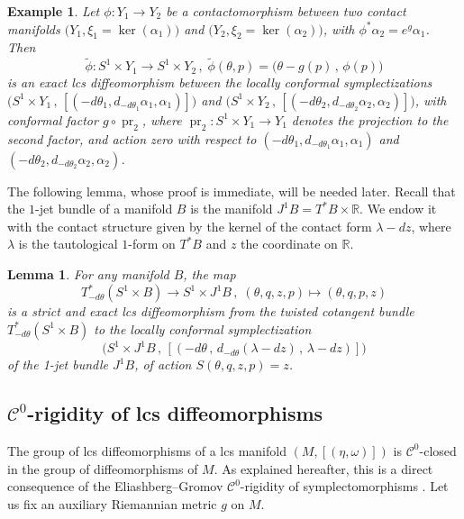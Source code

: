 \documentclass{amsart}
\DeclareMathOperator{\pr}{pr}
\newtheorem{lemma}[thm]{Lemma}
\newtheorem{example}[thm]{Example}
\theoremstyle{remark}
\begin{document}
\begin{example}\label{example: lift of maps to symplectization}
Let $\phi: Y_1 \rightarrow Y_2$ be a contactomorphism
between two contact manifolds $\big(Y_1, \xi_1 = \ker (\alpha_1)\big)$
and $\big(Y_2, \xi_2 = \ker (\alpha_2)\big)$,
with $\phi^{\ast}\alpha_2 = e^g\alpha_1$.
Then
\[
\widetilde{\phi}: S^1 \times Y_1 \rightarrow S^1 \times Y_2 \,,\;
\widetilde{\phi}(\theta, p) = \big( \theta - g(p) \,,\, \phi(p) \big)  
\]
is an exact lcs diffeomorphism
between the locally conformal symplectizations
$\big( S^1 \times Y_1 \,,\, [(-d\theta_1 , d_{-d\theta_1}\alpha_1 , \alpha_1)] \big)$
and $\big( S^1 \times Y_2 \,,\, [(-d\theta_2 , d_{-d\theta_2}\alpha_2 , \alpha_2)] \big)$,
with conformal factor $g \circ \pr_2$,
where $\pr_2: S^1 \times Y_1 \rightarrow Y_1$
denotes the projection to the second factor,
and action zero
with respect to $(-d\theta_1 , d_{-d\theta_1} \alpha_1 , \alpha_1)$
and $(-d\theta_2 , d_{-d\theta_2} \alpha_2 , \alpha_2)$.
\end{example}

The following lemma,
whose proof is immediate,
will be needed later.
Recall that the $1$-jet bundle of a manifold $B$
is the manifold $J^1B = T^{\ast}B \times \mathbb{R}$.
We endow it with the contact structure
given by the kernel of the contact form $\lambda - dz$,
where $\lambda$ is the tautological $1$-form on $T^{\ast}B$
and $z$ the coordinate on $\mathbb{R}$.

\begin{lemma}\label{lemma: identification twisted cotangent bundle with conformal symplectization}
For any manifold $B$,
the map
\[
T_{-d\theta}^{\ast} (S^1 \times B) \rightarrow S^1 \times J^1B \,,\;
(\theta, q, z, p) \mapsto (\theta, q, p, z)
\]
is a strict and exact lcs diffeomorphism
from the twisted cotangent bundle
$T^{\ast}_{- d\theta}(S^1 \times B)$
to the locally conformal symplectization 
\[
\big( S^1 \times J^1B \,,\,
[(-d\theta \,,\, d_{-d\theta} (\lambda - dz) \,,\, \lambda - dz)] \big)
\]
of the 1-jet bundle $J^1B$,
of action $S(\theta, q, z, p) = z$.
\end{lemma}

\subsection{$\mathcal{C}^0$-rigidity of lcs diffeomorphisms}\label{section: C0 rigidity}

The group of lcs diffeomorphisms
of a lcs manifold $(M, [(\eta, \omega)])$
is $\mathcal C^0$-closed
in the group of diffeomorphisms of $M$.
As explained hereafter,
this is a direct consequence of the Eliashberg--Gromov
$\mathcal C^0$-rigidity of symplectomorphisms \cite{Eliashberg}.
Let us fix an auxiliary Riemannian metric $g$ on $M$.
\end{document}
